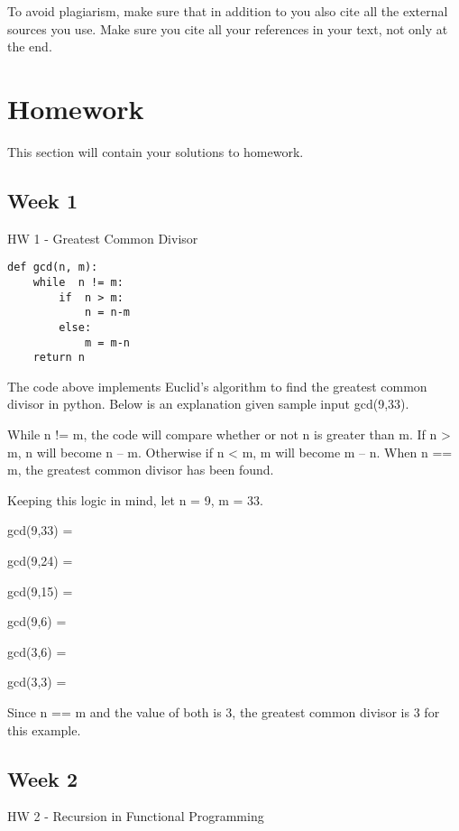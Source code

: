 \documentclass{article}
\theoremstyle{theorem}
\theoremstyle{definition}
\theoremstyle{remark}
\begin{document}
To avoid plagiarism, make sure that in addition to \cite{PL} you also cite all the external sources you use. Make sure you cite all your references in your text, not only at the end.

\section{Homework}\label{homework}

This section will contain your solutions to homework. 

\subsection{Week 1}

HW 1 - Greatest Common Divisor

\begin{lstlisting}
def gcd(n, m):
    while  n != m:
        if  n > m:
            n = n-m
        else:
            m = m-n
    return n 
\end{lstlisting}
%
The code above implements Euclid's algorithm to find the greatest common divisor in python. Below is an explanation given sample input gcd(9,33).

\medskip\noindent
While n != m, the code will compare whether or not n is greater than m. If n \textgreater{} m, n will become n -- m. Otherwise if n \textless{} m, m will become m -- n. When n == m, the greatest common divisor has been found.

\medskip\noindent
Keeping this logic in mind, let n = 9, m = 33.

\medskip\noindent
gcd(9,33) =

\medskip\noindent
gcd(9,24) =

\medskip\noindent
gcd(9,15) =

\medskip\noindent
gcd(9,6) =

\medskip\noindent
gcd(3,6) =

\medskip\noindent
gcd(3,3) =

\medskip{}

\medskip\noindent
Since n == m and the value of both is 3, the greatest common divisor is 3 for this example.


\subsection{Week 2}

HW 2 - Recursion in Functional Programming
\end{document}
